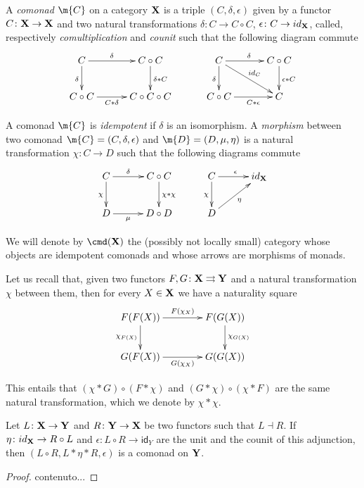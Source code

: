 \documentclass[a4paper,UKenglish,cleveref,pdftex,thm-restate,numberwithinsect]{lipics-v2021}
\newcommand{\id}[1]{\mathsf{id}_{#1}}
\def\X{\textbf {\textup{X}}}
\def\Y{\textbf {\textup{Y}}}
\def\G{\textbf {\textup{G}}}
\begin{document}
\iffalse 
\begin{definition}
	A \emph{comonad} $\m{C}$ on a category $\X$ is a triple $(C, \delta, \epsilon)$ given by a functor $C\colon \X\to \X$ and two natural transformations $\delta\colon C\to C\circ C $, $\epsilon\colon C\to \id{\X}$, called, respectively \emph{comultiplication} and \emph{counit} such that the following diagram commute
	\[\xymatrix@C=30pt{C \ar[d]_{\delta}\ar[r]^-{\delta}& C\circ C  \ar[d]^{\delta*C}&  C \ar[d]_{\delta}\ar[r]^{\delta} \ar[dr]^-{\id{C}} & C\circ C \ar[d]^{\epsilon *C}\\ C\circ C \ar[r]_-{C*\delta}& C\circ C\circ C & C\circ C \ar[r]_-{C*\epsilon} & C}\]
	
	A comonad $\m{C}$ is \emph{idempotent} if $\delta$ is an isomorphism.  A \emph{morphism} between two comonad $\m{C}=(C, \delta, \epsilon)$ and $\m{D}=(D, \mu, \eta)$ is a natural transformation $\chi\colon C\to D$ such that the following diagrams commute
	\[\xymatrix@C=30pt{ C \ar[r]^-{\delta} \ar[d]_{\chi} & C\circ C \ar[d]^{\chi*\chi}& C \ar[r]^{\epsilon} \ar[d]_{\chi}& 
		\id{\X}  \\ D \ar[r]_-{\mu} & D\circ D
		& D \ar[ur]_{\eta} }\]	
	
	We will denote by $\cmd(\X)$ the (possibly not locally small) category whose objects are idempotent comonads and whose arrows are morphisms of monads.
\end{definition}

\begin{remark} Let us recall that, given two functors $F, G\colon \X\rightrightarrows \Y$ and a natural transformation $\chi$ between them, then for every $X\in \X$ we have a naturality square
	\[\xymatrix@C=40pt{F(F(X)) \ar[r]^{F(\chi_X)} \ar[d]_{\chi_{F(X)}}& F(G(X)) \ar[d]^{\chi_{G(X)}}\\G(F(X)) \ar[r]_{G(\chi_X)} & G(G(X))}\]
	
	This entails that $(\chi * G)\circ (F*\chi)$ and $(G*\chi) \circ (\chi* F)$ are the same natural transformation, which we denote by $\chi*\chi$.
\end{remark}


\begin{proposition}
	Let $L\colon \X \to \Y$ and $R\colon \Y \to \X$ be two functors such that $L\dashv R$. If $\eta \colon \id{\X}\to R\circ L$ and $\epsilon\colon L\circ R \to \id{Y}$ are the unit and the counit of this adjunction, then $(L\circ R, L*\eta *R ,\epsilon)$ is a comonad on $\Y$.
\end{proposition}
\begin{proof}
	contenuto...
\end{proof}
\end{document}
